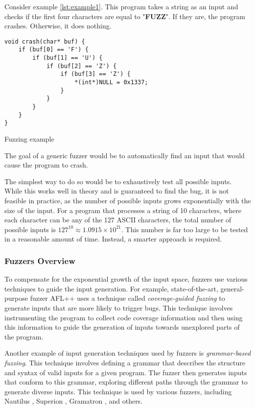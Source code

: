 Consider example \ref{lst:example1}. This program takes a string as an input and checks if the first four characters are equal to "\textbf{FUZZ}". If they are, the program crashes. Otherwise, it does nothing.

\begin{listing}[htp]
	\centering
	\begin{minipage}{.6\linewidth}
		\begin{verbatim}
void crash(char* buf) {
	if (buf[0] == 'F') {
		if (buf[1] == 'U') {
			if (buf[2] == 'Z') {
				if (buf[3] == 'Z') {
					*(int*)NULL = 0x1337;
				}
			}
		}
	}
}
		\end{verbatim}
	\end{minipage}
	\caption{Fuzzing example}
	\label{lst:example1}
\end{listing}

The goal of a generic fuzzer would be to automatically find an input that would cause the program to crash.

The simplest way to do so would be to exhaustively test all possible inputs. While this works well in theory and is guaranteed to find the bug, it is not feasible in practice, as the number of possible inputs grows exponentially with the size of the input. For a program that processes a string of 10 characters, where each character can be any of the 127 ASCII characters, the total number of possible inputs is $127^{10} \approx 1.0915 \times 10^{21}$. This number is far too large to be tested in a reasonable amount of time. Instead, a smarter approach is required.

\subsubsection{Fuzzers Overview}

To compensate for the exponential growth of the input space, fuzzers use various techniques to guide the input generation. For example, state-of-the-art, general-purpose fuzzer AFL++ \cite{AFLplusplus-Woot20} uses a technique called \textit{coverage-guided fuzzing} to generate inputs that are more likely to trigger bugs. This technique involves instrumenting the program to collect code coverage information and then using this information to guide the generation of inputs towards unexplored parts of the program.

Another example of input generation techniques used by fuzzers is \textit{grammar-based fuzzing}. This technique involves defining a grammar that describes the structure and syntax of valid inputs for a given program. The fuzzer then generates inputs that conform to this grammar, exploring different paths through the grammar to generate diverse inputs. This technique is used by various fuzzers, including Nautilus \cite{nautilus-grammar-fuzzer}, Superion \cite{superion-grammar-fuzzer}, Gramatron \cite{gramatron-effective-grammar-aware-fuzzing}, and others.

